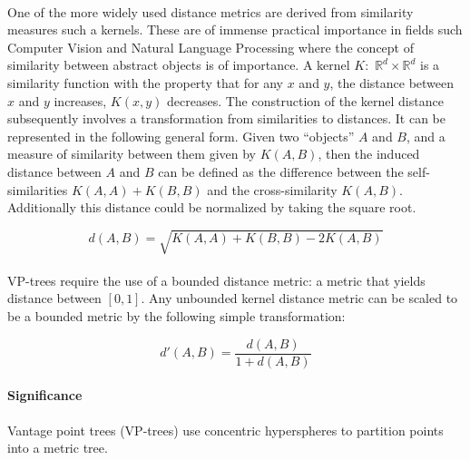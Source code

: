 \documentclass[11pt]{article}
\begin{document}
\paragraph{} One of the more widely used distance metrics are derived from similarity measures such a kernels. These are of immense practical importance in fields such Computer Vision and Natural Language Processing where the concept of similarity between abstract objects is of importance. A kernel $K:$ $\mathbb{R}^d \times \mathbb{R}^d$ is a similarity function with the property that for any $x$ and $y$, the distance between $x$ and $y$ increases, $K(x, y)$ decreases. The construction of the kernel distance subsequently involves a transformation from similarities to distances. It can be represented in the following general form. Given two “objects” $A$ and $B$, and a measure of similarity between them given by $K(A,B)$, then the induced distance between $A$ and $B$ can be defined as the difference between the self-similarities $K(A,A) + K(B,B)$ and the cross-similarity $K(A,B)$. Additionally this distance could be normalized by taking the square root. ~\cite{Phillips10}

\begin{equation}
d(A,B) = \sqrt{K(A,A) + K(B,B) - 2K(A,B)}
\end{equation}

\paragraph{} VP-trees require the use of a bounded distance metric: a metric that yields distance between $[0,1]$. Any unbounded kernel distance metric can be scaled to be a bounded metric by the following simple transformation: ~\cite{Yianilos93}

\begin{equation}
d'(A,B) = \frac{d(A,B)}{1 + d(A,B)}
\end{equation}

\paragraph*{Significance} 

Vantage point trees (VP-trees) use concentric hyperspheres to partition points into a metric tree. ~\cite{Yianilos93} 

{}

\end{document}
